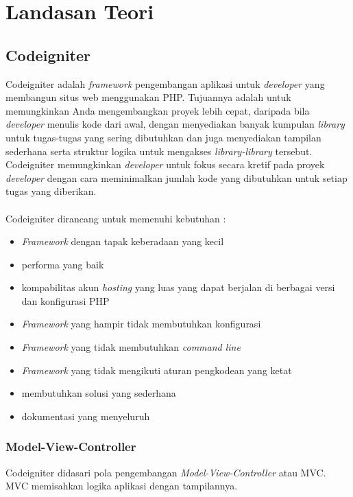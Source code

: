 \chapter{Landasan Teori}
\label{chap:teori}
\setcounter{secnumdepth}{3}
\section{Codeigniter}
\label{sec:codeigniter} 
 
Codeigniter adalah \textit{framework} pengembangan aplikasi untuk \textit{developer} yang membangun situs web menggunakan PHP. Tujuannya adalah untuk memungkinkan Anda mengembangkan proyek lebih cepat, daripada bila \textit{developer} menulis kode dari awal, dengan menyediakan banyak kumpulan \textit{library} untuk tugas-tugas yang sering dibutuhkan dan juga menyediakan tampilan sederhana serta struktur logika untuk mengakses \textit{library-library} tersebut. Codeigniter memungkinkan \textit{developer} untuk fokus secara kretif pada proyek \textit{developer} dengan cara meminimalkan jumlah kode yang dibutuhkan untuk setiap tugas yang diberikan. \cite{codeigniter:17}
\\
\\
Codeigniter dirancang untuk memenuhi kebutuhan :
\begin{itemize}
		\item \textit{Framework} dengan tapak keberadaan yang kecil
		\item performa yang baik
		\item kompabilitas akun \textit{hosting} yang luas yang dapat berjalan di berbagai versi dan konfigurasi PHP
		\item \textit{Framework} yang hampir tidak membutuhkan konfigurasi
		\item \textit{Framework} yang tidak membutuhkan \textit{command line}
		\item \textit{Framework} yang tidak mengikuti aturan pengkodean yang ketat
		\item membutuhkan solusi yang sederhana
		\item dokumentasi yang menyeluruh
	\end{itemize}
	
\subsection{Model-View-Controller}
Codeigniter didasari pola pengembangan \textit{Model-View-Controller} atau MVC. MVC memisahkan logika aplikasi dengan tampilannya.

